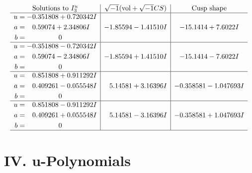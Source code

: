 \documentclass[1p]{elsarticle_modified}
\theoremstyle{definition}
\newcommand{\I}{\sqrt{-1}}
\begin{document}
$$\begin{array}{c|c|c}  
\text{Solutions to }I^u_{3}& \I (\text{vol} + \sqrt{-1}CS) & \text{Cusp shape}\\
 \hline 
\begin{aligned}
u &= -0.351808 + 0.720342 I \\
a &= \phantom{-}0.59074 + 2.34806 I \\
b &= \phantom{-0.000000 } 0\end{aligned}
 & -1.85594 - 1.41510 I & -15.1414 + 7.6022 I \\ \hline\begin{aligned}
u &= -0.351808 - 0.720342 I \\
a &= \phantom{-}0.59074 - 2.34806 I \\
b &= \phantom{-0.000000 } 0\end{aligned}
 & -1.85594 + 1.41510 I & -15.1414 - 7.6022 I \\ \hline\begin{aligned}
u &= \phantom{-}0.851808 + 0.911292 I \\
a &= \phantom{-}0.409261 - 0.055548 I \\
b &= \phantom{-0.000000 } 0\end{aligned}
 & \phantom{-}5.14581 + 3.16396 I & -0.358581 - 1.047693 I \\ \hline\begin{aligned}
u &= \phantom{-}0.851808 - 0.911292 I \\
a &= \phantom{-}0.409261 + 0.055548 I \\
b &= \phantom{-0.000000 } 0\end{aligned}
 & \phantom{-}5.14581 - 3.16396 I & -0.358581 + 1.047693 I\\
 \hline 
 \end{array}$$\newpage
\newpage\renewcommand{\arraystretch}{1}
\centering \section*{ IV. u-Polynomials}
\end{document}
